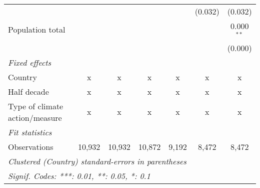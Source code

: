 \begin{tabular}{lcccccc}
                                                             &         &         &         &         & (0.032) & (0.032)\\   
   Population total                                          &         &         &         &         &         & 0.000$^{**}$\\   
                                                             &         &         &         &         &         & (0.000)\\   
   \emph{Fixed effects}\\
   Country                                                   & x       & x       & x       & x       & x       & x\\  
   Half decade                                               & x       & x       & x       & x       & x       & x\\  
   Type of climate action/measure                            & x       & x       & x       & x       & x       & x\\  
   \midrule \emph{Fit statistics}\\
   Observations                                              & 10,932  & 10,932  & 10,872  & 9,192   & 8,472   & 8,472\\  
   \midrule
   \multicolumn{7}{l}{\emph{Clustered (Country) standard-errors in parentheses}}\\
   \multicolumn{7}{l}{\emph{Signif. Codes: ***: 0.01, **: 0.05, *: 0.1}}\\
\end{tabular}
\par\endgroup



